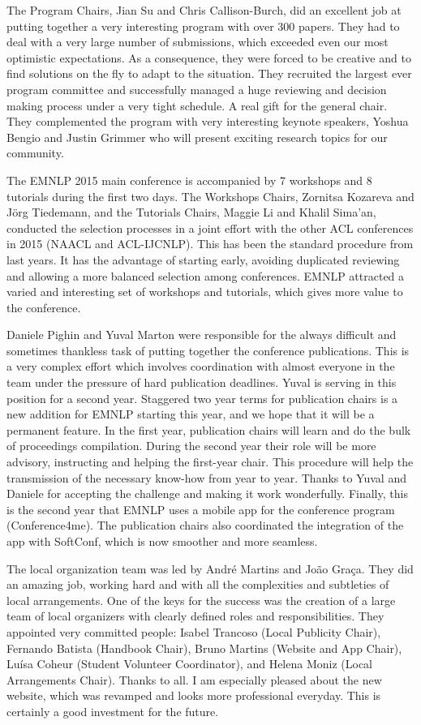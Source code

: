 The Program Chairs, Jian Su and Chris Callison-Burch, did an excellent
job at putting together a very interesting program with over 300 papers.
They had to deal with a very large number of submissions, which exceeded
even our most optimistic expectations. As a consequence, they were
forced to be creative and to find solutions on the fly to adapt to
the situation. They recruited the largest ever program committee and
successfully managed a huge reviewing and decision making process
under a very tight schedule. A real gift for the general chair. They
complemented the program with very interesting keynote speakers, Yoshua
Bengio and Justin Grimmer who will present exciting research topics
for our community.

The EMNLP 2015 main conference is accompanied by 7 workshops and 8
tutorials during the first two days. The Workshops Chairs, Zornitsa
Kozareva and Jörg Tiedemann, and the Tutorials Chairs, Maggie Li and
Khalil Sima'an, conducted the selection processes in a joint effort
with the other ACL conferences in 2015 (NAACL and ACL-IJCNLP). This
has been the standard procedure from last years. It has the advantage
of starting early, avoiding duplicated reviewing and allowing a more
balanced selection among conferences. EMNLP attracted a varied and
interesting set of workshops and tutorials, which gives more value
to the conference.

Daniele Pighin and Yuval Marton were responsible for the always difficult
and sometimes thankless task of putting together the conference publications.
This is a very complex effort which involves coordination with almost
everyone in the team under the pressure of hard publication deadlines.
Yuval is serving in this position for a second year. Staggered two
year terms for publication chairs is a new addition for EMNLP starting
this year, and we hope that it will be a permanent feature. In the
first year, publication chairs will learn and do the bulk of proceedings
compilation. During the second year their role will be more advisory,
instructing and helping the first-year chair. This procedure will
help the transmission of the necessary know-how from year to year.
Thanks to Yuval and Daniele for accepting the challenge and making
it work wonderfully. Finally, this is the second year that EMNLP uses
a mobile app for the conference program (Conference4me). The publication
chairs also coordinated the integration of the app with SoftConf,
which is now smoother and more seamless.

The local organization team was led by André Martins and João Graça.
They did an amazing job, working hard and with all the complexities
and subtleties of local arrangements. One of the keys for the success
was the creation of a large team of local organizers with clearly
defined roles and responsibilities. They appointed very committed
people: Isabel Trancoso (Local Publicity Chair), Fernando Batista
(Handbook Chair), Bruno Martins (Website and App Chair), Luísa Coheur
(Student Volunteer Coordinator), and Helena Moniz (Local Arrangements
Chair). Thanks to all. I am especially pleased about the new website,
which was revamped and looks more professional everyday. This is certainly
a good investment for the future.


